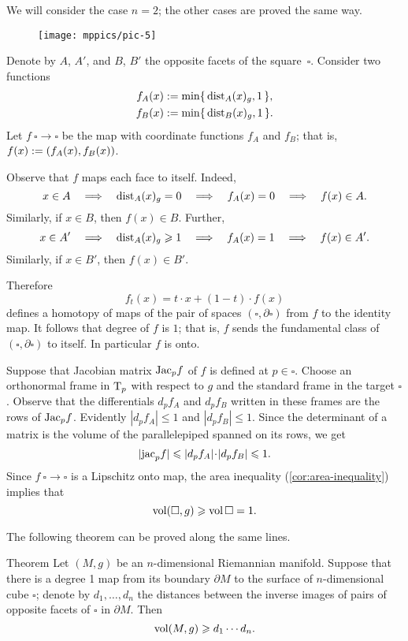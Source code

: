 We will consider the case $n=2$; the other cases are proved the same way.

\begin{wrapfigure}{r}{30mm}
\vskip-0mm
\centering
\texttt{[image: mppics/pic-5]}
\end{wrapfigure}

Denote by $A$, $A'$, and $B$, $B'$ the opposite facets of the square~$\square$.
Consider two functions
\begin{align*}
f_A(x)&\mathrel{:=}\min\{\,\mathrm{dist}_A(x)_g,1\,\},
\\
f_B(x)&\mathrel{:=}\min\{\,\mathrm{dist}_B(x)_g,1\,\}.
\end{align*}
Let $f\:\square\to\square$ be the map with coordinate functions $f_A$ and $f_B$;
that is, $f(x)\mathrel{:=}(f_A(x), f_B(x))$.

Observe that $f$ maps each face to itself.
Indeed, 
\[x\in A \quad\Longrightarrow\quad \mathrm{dist}_A(x)_g=0 \quad\Longrightarrow\quad f_A(x)=0 \quad\Longrightarrow\quad f(x)\in A.\]
Similarly, if $x\in B$, then $f(x)\in B$.
Further, 
\[x\in A'
\quad\Longrightarrow\quad 
\mathrm{dist}_A(x)_g\geqslant 1 
\quad\Longrightarrow\quad 
f_A(x)=1 
\quad\Longrightarrow\quad 
f(x)\in A'.\]
Similarly, if $x\in B'$, then $f(x)\in B'$.

Therefore 
\[f_t(x)= t\cdot x + (1-t)\cdot f(x)\]
defines a homotopy of maps of the pair of spaces $(\square,\partial \square)$ from $f$ to the identity map.
It follows that degree of $f$ is $1$; that is, $f$ sends the fundamental class of $(\square,\partial \square)$ to itself.
In particular $f$ is onto.

Suppose that Jacobian  matrix $\mathrm{Jac}_pf$ of $f$ is defined at $p\in \square$.
Choose an orthonormal frame in $\operatorname{\rm T}_p$ with respect to $g$ and the standard frame in the target $\square$.
Observe that the differentials $d_pf_A$ and $d_pf_B$ written in these frames are the rows of $\mathrm{Jac}_pf$.
Evidently $|d_pf_A|\le 1$ and $|d_pf_B|\le 1$.
Since the determinant of a matrix is the volume of the parallelepiped spanned on its rows, we get 
\[|\jac_p f|\le |d_pf_A|\cdot|d_pf_B|\le 1.\]
Since $f\:\square\to\square$ is a Lipschitz onto map, the area inequality (\ref{cor:area-inequality}) implies that 
\[\operatorname{\rm vol}\nolimits(\square,g)\geqslant \operatorname{\rm vol}\nolimits\square=1.\]
\qedsf

The following theorem can be proved along the same lines.


\begin{thm}{Theorem}\label{thm:besikovitch+}
Let $(M,g)$ be an $n$-dimensional Riemannian manifold.
Suppose that there is a degree 1 map from its boundary $\partial M$ to the surface of $n$-dimensional cube $\square$;
denote by $d_1,\dots, d_n$ the distances between the inverse images of pairs of opposite facets of $\square$ in $\partial M$.
Then 
\[\operatorname{\rm vol}\nolimits(M,g)\geqslant d_1\cdots d_n.\]
\end{thm}

